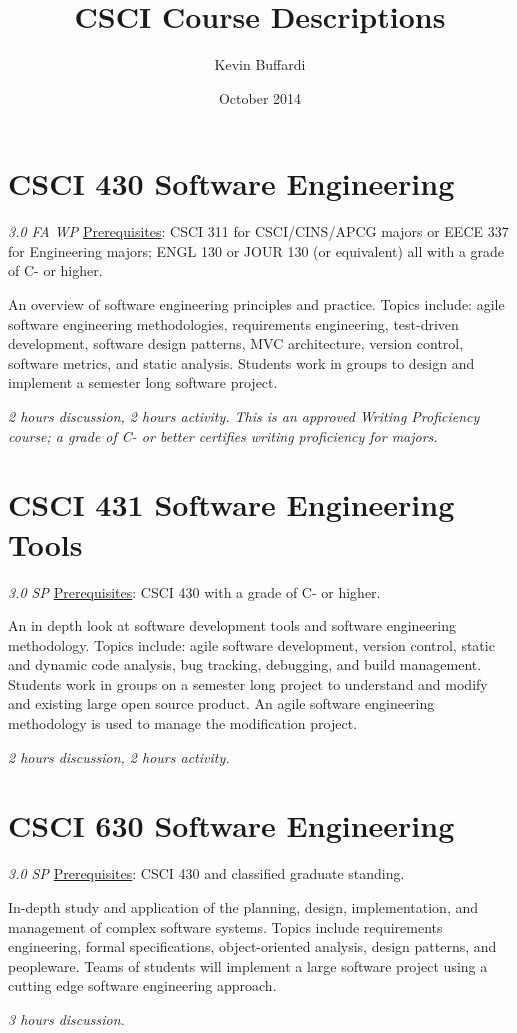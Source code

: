 \documentclass[12pt]{article}
\title{CSCI Course Descriptions}
\author{Kevin Buffardi}
\date{October 2014}
\begin{document}
  \maketitle
  \section*{CSCI 430 Software Engineering}	 	
  \textit{3.0 FA WP}
  \underline{Prerequisites}: CSCI 311 for CSCI/CINS/APCG majors or EECE 337 for Engineering majors; ENGL 130 or JOUR 130 (or equivalent) all with a grade of C- or higher.

  An overview of software engineering principles and practice. Topics include: agile software engineering methodologies, requirements engineering, test-driven development, software design patterns, MVC architecture, version control, software metrics, and static analysis. Students work in groups to design and implement a semester long software project. 

  \textit{2 hours discussion, 2 hours activity. This is an approved Writing Proficiency course; a grade of C- or better certifies writing proficiency for majors.}
  
  \section*{CSCI 431 Software Engineering Tools}
  \textit{3.0 SP}	 
  \underline{Prerequisites}: CSCI 430 with a grade of C- or higher.

  An in depth look at software development tools and software engineering methodology. Topics include: agile software development, version control, static and dynamic code analysis, bug tracking, debugging, and build management. Students work in groups on a semester long project to understand and modify and existing large open source product. An agile software engineering methodology is used to manage the modification project. 

  \textit{2 hours discussion, 2 hours activity.}

  \section*{CSCI 630	Software Engineering}
  \textit{3.0 SP}
  \underline{Prerequisites}: CSCI 430 and classified graduate standing.

  In-depth study and application of the planning, design, implementation, and management of complex software systems. Topics include requirements engineering, formal specifications, object-oriented analysis, design patterns, and peopleware. Teams of students will implement a large software project using a cutting edge software engineering approach. 

  \textit{3 hours discussion.}
\end{document}
